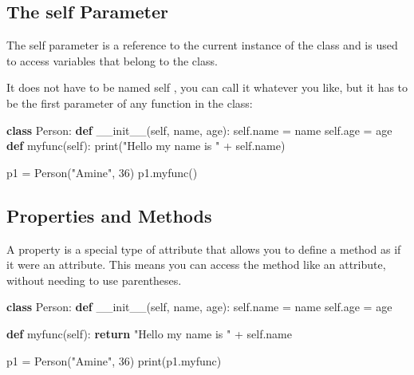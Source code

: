 \documentclass[11pt]{article}
\newenvironment{Shaded}{}{}
\newcommand{\KeywordTok}[1]{\textcolor[rgb]{0.00,0.44,0.13}{\textbf{{#1}}}}
\newcommand{\DecValTok}[1]{\textcolor[rgb]{0.25,0.63,0.44}{{#1}}}
\newcommand{\StringTok}[1]{\textcolor[rgb]{0.25,0.44,0.63}{{#1}}}
\newcommand{\FunctionTok}[1]{\textcolor[rgb]{0.02,0.16,0.49}{{#1}}}
\newcommand{\NormalTok}[1]{{#1}}
\newcommand{\VariableTok}[1]{\textcolor[rgb]{0.10,0.09,0.49}{{#1}}}
\newcommand{\ControlFlowTok}[1]{\textcolor[rgb]{0.00,0.44,0.13}{\textbf{{#1}}}}
\newcommand{\OperatorTok}[1]{\textcolor[rgb]{0.40,0.40,0.40}{{#1}}}
\newcommand{\BuiltInTok}[1]{{#1}}
\begin{document}
\subsection{The self Parameter}\label{the-self-parameter}

The self parameter is a reference to the current instance of the class
and is used to access variables that belong to the class.

It does not have to be named self , you can call it whatever you like,
but it has to be the first parameter of any function in the class:

\begin{Shaded}
\begin{Highlighting}[]
\KeywordTok{class}\NormalTok{ Person:}
    \KeywordTok{def} \FunctionTok{\_\_init\_\_}\NormalTok{(}\VariableTok{self}\NormalTok{, name, age):}
        \VariableTok{self}\NormalTok{.name }\OperatorTok{=}\NormalTok{ name}
        \VariableTok{self}\NormalTok{.age }\OperatorTok{=}\NormalTok{ age}
    \KeywordTok{def}\NormalTok{ myfunc(}\VariableTok{self}\NormalTok{):}
        \BuiltInTok{print}\NormalTok{(}\StringTok{"Hello my name is "} \OperatorTok{+} \VariableTok{self}\NormalTok{.name)}

\NormalTok{p1 }\OperatorTok{=}\NormalTok{ Person(}\StringTok{"Amine"}\NormalTok{, }\DecValTok{36}\NormalTok{)}
\NormalTok{p1.myfunc()}
\end{Highlighting}
\end{Shaded}

\subsection{Properties and Methods}\label{properties-and-methods}

A property is a special type of attribute that allows you to define a
method as if it were an attribute. This means you can access the method
like an attribute, without needing to use parentheses.

\begin{Shaded}
\begin{Highlighting}[]
\KeywordTok{class}\NormalTok{ Person:}
    \KeywordTok{def} \FunctionTok{\_\_init\_\_}\NormalTok{(}\VariableTok{self}\NormalTok{, name, age):}
        \VariableTok{self}\NormalTok{.name }\OperatorTok{=}\NormalTok{ name}
        \VariableTok{self}\NormalTok{.age }\OperatorTok{=}\NormalTok{ age}

    \KeywordTok{def}\NormalTok{ myfunc(}\VariableTok{self}\NormalTok{):}
        \ControlFlowTok{return} \StringTok{"Hello my name is "} \OperatorTok{+} \VariableTok{self}\NormalTok{.name}

\NormalTok{p1 }\OperatorTok{=}\NormalTok{ Person(}\StringTok{"Amine"}\NormalTok{, }\DecValTok{36}\NormalTok{)}
\BuiltInTok{print}\NormalTok{(p1.myfunc)}
\end{Highlighting}
\end{Shaded}
\end{document}

